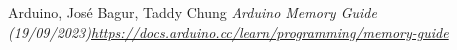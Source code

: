 \documentclass[a4paper, english]{article}
\numberwithin{equation}{section}
\begin{document}
\begin{thebibliography}{1}
    Arduino, José Bagur, Taddy Chung \emph{Arduino Memory Guide (19/09/2023)\newline \href{https://docs.arduino.cc/learn/programming/memory-guide}{https://docs.arduino.cc/learn/programming/memory-guide}}
\end{thebibliography}

%
%




%
\end{document}
